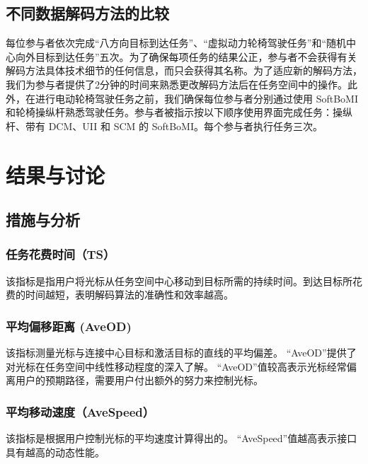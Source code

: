 
\subsection{不同数据解码方法的比较} 每位参与者依次完成``八方向目标到达任务''、``虚拟动力轮椅驾驶任务''和“随机中心向外目标到达任务”五次。为了确保每项任务的结果公正，参与者不会获得有关解码方法具体技术细节的任何信息，而只会获得其名称。为了适应新的解码方法，我们为参与者提供了2分钟的时间来熟悉更改解码方法后在任务空间中的操作。此外，在进行电动轮椅驾驶任务之前，我们确保每位参与者分别通过使用 SoftBoMI 和轮椅操纵杆熟悉驾驶任务。参与者被指示按以下顺序使用界面完成任务：操纵杆、带有 DCM、UII 和 SCM 的 SoftBoMI。每个参与者执行任务三次。  

\section{结果与讨论  }     

\subsection{措施与分析  }   
 \subsubsection{任务花费时间（TS）  }    该指标是指用户将光标从任务空间中心移动到目标所需的持续时间。到达目标所花费的时间越短，表明解码算法的准确性和效率越高。
 \subsubsection{平均偏移距离 (AveOD)  }    该指标测量光标与连接中心目标和激活目标的直线的平均偏差。 “AveOD”提供了对光标在任务空间中线性移动程度的深入了解。 “AveOD”值较高表示光标经常偏离用户的预期路径，需要用户付出额外的努力来控制光标。
 \subsubsection{平均移动速度（AveSpeed）  }    该指标是根据用户控制光标的平均速度计算得出的。 “AveSpeed”值越高表示接口具有越高的动态性能。
